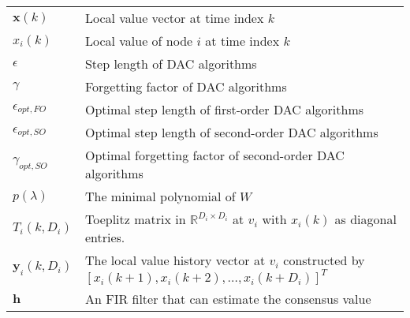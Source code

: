 \begin{tabular}{p{2.5cm} p{11cm}}
$\mathbf{x}\left(k\right)$  &  Local value vector at time index
$k$\\


$x_{i}\left(k\right)$  &  Local value of node $i$ at time index
$k$\\


$\epsilon$ &  Step length of DAC algorithms\\


$\gamma$ &  Forgetting factor of DAC algorithms\\


$\epsilon_{opt,FO}$ &  Optimal step length of first-order DAC algorithms\\


$\epsilon_{opt,SO}$ &  Optimal step length of second-order DAC algorithms\\


$\gamma_{opt,SO}$ &  Optimal forgetting factor of second-order DAC
algorithms\\


$p(\lambda)$  &  The minimal polynomial of $W$ \\


$T_{i}\left(k,D_{i}\right)$  &  Toeplitz matrix in $\mathbb{R}^{D_{i}\times D_{i}}$
at $v_{i}$ with $x_{i}\left(k\right)$ as diagonal entries.\\


$\mathbf{y}_{i}\left(k,D_{i}\right)$  &  The local value history
vector at $v_{i}$ constructed by $\left[x_{i}\left(k+1\right),x_{i}\left(k+2\right),\ldots,x_{i}\left(k+D_{i}\right)\right]^{T}$
\\


$\mathbf{h}$  &  An FIR filter that can estimate the consensus value
\\


\end{tabular} 
